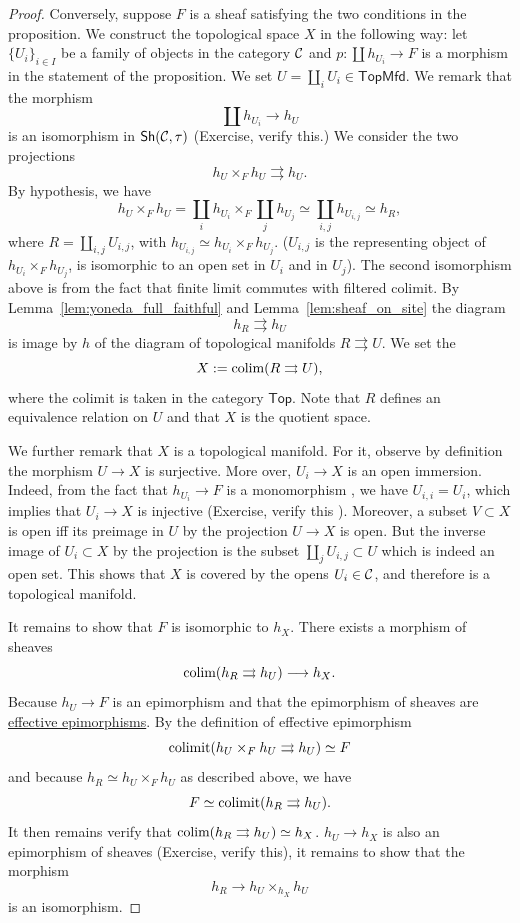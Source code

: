 \documentclass{tufte-book} %
\numberwithin{dummy}{section}
\newcommand{\calc}{{\cal C}}
\newcommand{\lrta}{\longrightarrow}
\begin{document}
\begin{proof}
Conversely, suppose $F$ is a sheaf satisfying the two conditions in the proposition. We construct the topological space $X$ in the following way: let $\{U_i\}_{i\in I}$ be a family of objects in the category $\calc$ and $p:\coprod h_{U_i}\lrta F$ is a morphism in the statement of the proposition. We set $U=\coprod_i U_i\in \mathsf{TopMfd}$. We remark that the morphism
$$
\coprod h_{U_i}\lrta h_U
$$
is an isomorphism in $\mathsf{Sh}(\calc,\tau)$ (Exercise, verify this.) We consider the two projections
$$
h_U\times_F h_U\rightrightarrows h_U.
$$
By hypothesis, we have
$$
h_U\times_F h_U= \coprod_{i} h_{U_i}\times_F\coprod_{j} h_{U_j}\simeq\coprod_{i,j} h_{U_{i,j}}\simeq h_R,
$$
where $R=\coprod_{i,j}U_{i,j}$, with $h_{U_{i,j}}\simeq h_{U_i}\times_F h_{U_j}$. ($U_{i,j}$ is the representing object of $h_{U_i}\times_F h_{U_j}$, is isomorphic to an open set in $U_i$ and in $U_j$). The second isomorphism above is from the fact that finite limit commutes with filtered colimit. By Lemma~\ref{lem:yoneda_full_faithful} and Lemma~\ref{lem:sheaf_on_site} the diagram 
$$
h_R\rightrightarrows h_U
$$
is image by $h$ of the diagram of topological manifolds $R\rightrightarrows U$. We set the 
$$
X:=\textnormal{colim}(R\rightrightarrows U),
$$
where the colimit is taken in the category $\mathsf{Top}$. Note that $R$ defines an equivalence relation on $U$ and that $X$ is the quotient space.

We further remark that $X$ is a topological manifold. For it, observe by definition the morphism $U\lrta X$ is surjective. More over, $U_i\lrta X$ is an open immersion. Indeed, from the fact that $h_{U_i}\lrta F$ is a monomorphism , we have $U_{i,i}=U_i$, which implies that $U_i\lrta X$ is injective (Exercise, verify this
). Moreover, a subset $V\subset X$ is open iff its preimage in $U$ by the projection $U\lrta X$ is open. But the inverse image of $U_i\subset X$ by the projection is the subset $\coprod_j U_{i,j}\subset U$ which is indeed an open set. This shows that $X$ is covered by the opens $U_i\in\calc$, and therefore is a topological manifold.

It remains to show that $F$ is isomorphic to $h_X$. There exists a morphism of sheaves
$$
\textnormal{colim}(h_R\rightrightarrows h_U)\lrta h_X.
$$
Because $h_U\lrta F$ is an epimorphism and that the epimorphism of sheaves are \href{https://ncatlab.org/nlab/show/effective+epimorphism}{  effective epimorphisms}.
By the definition of effective epimorphism
$$
\textnormal{colimit}(h_U\times_Fh_U\rightrightarrows h_U)\simeq F
$$
and because $h_R\simeq h_U\times_F h_U$ as described above, we have
$$
F\simeq \textnormal{colimit}(h_R\rightrightarrows h_U).
$$
It then remains verify that $\textnormal{colim}(h_R\rightrightarrows h_U)\simeq h_X$. $h_U\lrta h_X$ is also an epimorphism of sheaves (Exercise, verify this), it remains to show that the morphism
$$
h_R\lrta h_U\times_{h_X} h_U
$$
is an isomorphism.


\end{proof}
\end{document}
